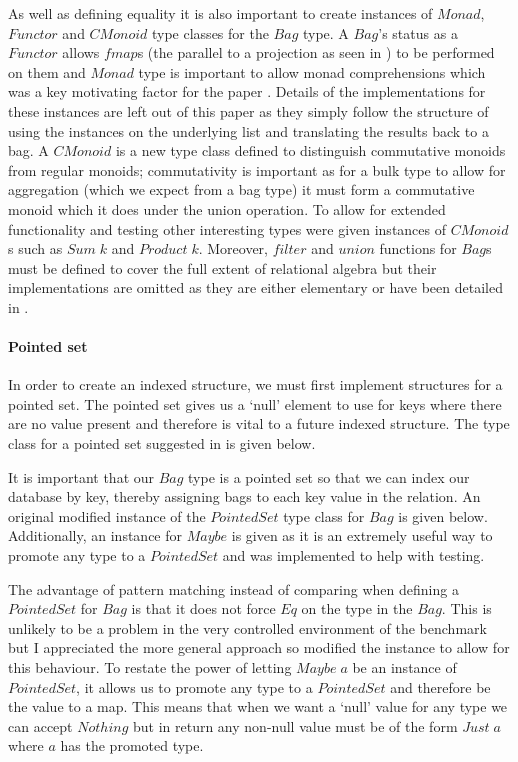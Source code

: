 As well as defining equality it is also important to create instances of $Monad$,
$Functor$ and $CMonoid$ type classes for the $Bag$ type. A $Bag$'s status as a
$Functor$ allows $fmap$s
(the parallel to a projection as seen in ) to be performed on
them and $Monad$ type is important to allow monad comprehensions which was a key
motivating factor for the paper \relalg{}. Details of the implementations for these instances are
left out of this paper as they simply follow the structure of using the instances on
the underlying list and translating the results back to a bag. A $CMonoid$ is a new type class
defined to distinguish commutative monoids from regular monoids; commutativity
is important as for a bulk type to allow for aggregation (which we expect from a
bag type) it must form a commutative monoid which it does under the union
operation. To allow for extended functionality and testing other interesting
types were given instances of $CMonoid$s such as $Sum\;k$ and $Product\;k$.
Moreover, $filter$
and $union$ functions for $Bag$s must be defined to cover the full extent of
relational algebra but their implementations are omitted as they are either
elementary or have been detailed in \relalg{}.

\paragraph{Pointed set} In order to create an indexed structure, we must first
implement structures for a pointed set. The pointed set gives us a `null'
element to use for keys where there are no value present and therefore is vital
to a future indexed structure. The type class for a pointed set suggested in
\relalg{} is given below.



\noindent
It is important that our $Bag$ type is a pointed set so that we can index our
database by key, thereby assigning bags to each key value in the relation. An
original modified instance of the $PointedSet$ type class for $Bag$ is given
below. Additionally, an instance for $Maybe$ is given as it is an extremely
useful way to promote any type to a $PointedSet$ and was implemented to help
with testing.



\noindent
The advantage of pattern matching instead of comparing when defining a
$PointedSet$ for $Bag$ is that it does not force $Eq$ on the type in the $Bag$.
This is unlikely to be a problem in the very controlled environment of the
benchmark but I appreciated the more general approach so modified the instance
to allow for this behaviour. To restate the power of letting $Maybe\;a$ be an
instance of $PointedSet$, it allows us to promote any type to a $PointedSet$ and
therefore be the value to a map. This means that when we want a `null' value for
any type we can accept $Nothing$ but in return any non-null value must be of the
form $Just\;a$ where $a$ has the promoted type.

